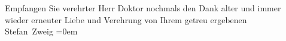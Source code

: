 \pstart
           Empfangen Sie verehrter Herr Doktor nochmals den Dank alter und immer wieder
               erneuter Liebe und Verehrung von Ihrem getreu ergebenen{\\[\baselineskip]}\spacefill\mbox{Stefan Zweig}\pend
           \leftskip=0em{}\endnumbering{}  
      